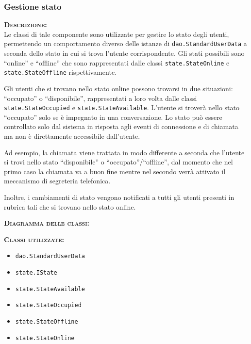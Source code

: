 \subsubsection{Gestione stato}
\begin{description}
	\item{\scshape\bfseries Descrizione:}\\
	Le classi di tale componente sono utilizzate per gestire lo stato degli utenti, permettendo un comportamento diverso delle istanze di \texttt{dao.StandardUserData} a seconda dello stato in cui si trova l'utente corrispondente. Gli stati possibili sono ``online'' e ``offline'' che sono rappresentati dalle classi \texttt{state.StateOnline} e \texttt{state.StateOffline} rispettivamente.
	
	Gli utenti che si trovano nello stato online possono trovarsi in due situazioni: ``occupato'' o ``disponibile'', rappresentati a loro volta dalle classi \texttt{state.StateOccupied} e \texttt{state.StateAvailable}. L'utente si troverà nello stato ``occupato'' solo se è impegnato in una conversazione. Lo stato può essere controllato solo dal sistema in risposta agli eventi di connessione e di chiamata ma non è direttamente accessibile dall'utente.
	
	Ad esempio, la chiamata viene trattata in modo differente a seconda che l'utente si trovi nello stato ``disponibile'' o ``occupato''/``offline'', dal momento che nel primo caso la chiamata va a buon fine mentre nel secondo verrà attivato il meccanismo di segreteria telefonica.
	
	Inoltre, i cambiamenti di stato vengono notificati a tutti gli utenti presenti in rubrica tali che si trovano nello stato online.
	
	\item{\scshape\bfseries Diagramma delle classi:}
	\item{\scshape\bfseries Classi utilizzate:}\\ 
	\begin{itemize}
          \item \texttt{dao.StandardUserData}
          \item \texttt{state.IState}
          \item \texttt{state.StateAvailable}
          \item \texttt{state.StateOccupied}
          \item \texttt{state.StateOffline}
          \item \texttt{state.StateOnline}
	\end{itemize}
\end{description}

